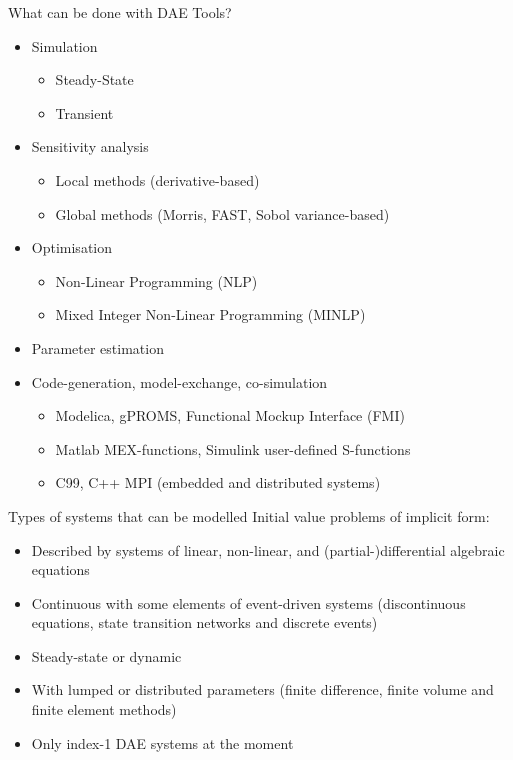 \documentclass[compress,newPxFont,sthlmFooter]{beamer}
\begin{document}
\begin{frame}{What can be done with DAE Tools?} 
\begin{itemize}
  \item \alert{Simulation}
    \begin{itemize}
      \item Steady-State 
      \item Transient
    \end{itemize}
  \item \alert{Sensitivity analysis}
    \begin{itemize}
      \item Local methods (derivative-based) 
      \item Global methods (Morris, FAST, Sobol variance-based)
    \end{itemize}
  \item \alert{Optimisation}
    \begin{itemize}
      \item Non-Linear Programming (NLP)
      \item Mixed Integer Non-Linear Programming (MINLP)
    \end{itemize}
  \item \alert{Parameter estimation}
  \item \alert{Code-generation}, \alert{model-exchange}, \alert{co-simulation} 
    \begin{itemize}
      \item Modelica, gPROMS, Functional Mockup Interface (FMI)
      \item Matlab MEX-functions, Simulink user-defined S-functions
      \item C99, C++ MPI (embedded and distributed systems) 
    \end{itemize}
\end{itemize}
\end{frame}

\begin{frame}{Types of systems that can be modelled}
  \alert{Initial value problems of implicit form}:
    \begin{itemize}
      \item Described by \alert{systems of linear, non-linear, and (partial-)differential} algebraic equations
      \item \alert{Continuous} with some elements of \alert{event-driven} systems 
            (discontinuous equations, state transition networks and discrete events) 
      \item \alert{Steady-state} or \alert{dynamic}
      \item With \alert{lumped} or \alert{distributed} parameters 
            (finite difference, finite volume and finite element methods)
      \item Only \alert{index-1} DAE systems at the moment
    \end{itemize}
\end{frame}
\end{document}
